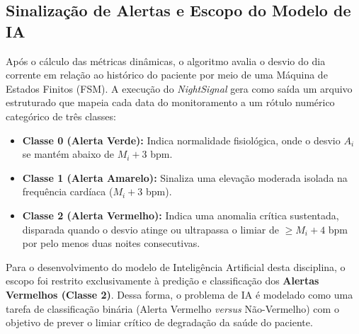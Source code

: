 \subsection{Sinalização de Alertas e Escopo do Modelo de IA}

Após o cálculo das métricas dinâmicas, o algoritmo avalia o desvio do dia corrente em relação ao histórico do paciente por meio de uma Máquina de Estados Finitos (FSM). A execução do \textit{NightSignal} gera como saída um arquivo estruturado que mapeia cada data do monitoramento a um rótulo numérico categórico de três classes:
\begin{itemize}
    \item \textbf{Classe 0 (Alerta Verde):} Indica normalidade fisiológica, onde o desvio $A_i$ se mantém abaixo de $M_i + 3$ bpm.
    \item \textbf{Classe 1 (Alerta Amarelo):} Sinaliza uma elevação moderada isolada na frequência cardíaca ($M_i + 3$ bpm).
    \item \textbf{Classe 2 (Alerta Vermelho):} Indica uma anomalia crítica sustentada, disparada quando o desvio atinge ou ultrapassa o limiar de $\geq M_i + 4$ bpm por pelo menos duas noites consecutivas.
\end{itemize}

Para o desenvolvimento do modelo de Inteligência Artificial desta disciplina, o escopo foi restrito exclusivamente à predição e classificação dos \textbf{Alertas Vermelhos (Classe 2)}. Dessa forma, o problema de IA é modelado como uma tarefa de classificação binária (Alerta Vermelho \textit{versus} Não-Vermelho) com o objetivo de prever o limiar crítico de degradação da saúde do paciente.
